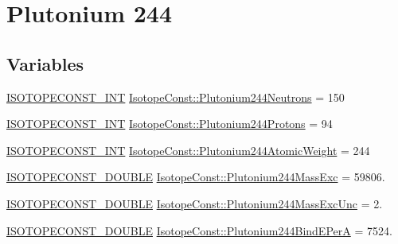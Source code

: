 \hypertarget{group___isotope_const-_plutonium-_pu244}{}\section{Plutonium 244}
\label{group___isotope_const-_plutonium-_pu244}
\subsection*{Variables}
\begin{DoxyCompactItemize}
\item 
\mbox{\hyperlink{group___isotope_const-_macros_ga5f18360b3e99483a35c32d789e62621c}{I\+S\+O\+T\+O\+P\+E\+C\+O\+N\+S\+T\+\_\+\+I\+NT}} \mbox{\hyperlink{group___isotope_const-_plutonium-_pu244_gae983817ecb52061ff706d189ea3bfec6}{Isotope\+Const\+::\+Plutonium244\+Neutrons}} = 150
\item 
\mbox{\hyperlink{group___isotope_const-_macros_ga5f18360b3e99483a35c32d789e62621c}{I\+S\+O\+T\+O\+P\+E\+C\+O\+N\+S\+T\+\_\+\+I\+NT}} \mbox{\hyperlink{group___isotope_const-_plutonium-_pu244_ga9787c2aa640a2328cdd90795dabf9a7a}{Isotope\+Const\+::\+Plutonium244\+Protons}} = 94
\item 
\mbox{\hyperlink{group___isotope_const-_macros_ga5f18360b3e99483a35c32d789e62621c}{I\+S\+O\+T\+O\+P\+E\+C\+O\+N\+S\+T\+\_\+\+I\+NT}} \mbox{\hyperlink{group___isotope_const-_plutonium-_pu244_ga065f95bb13a9b5dbdb73e11e9feccbb0}{Isotope\+Const\+::\+Plutonium244\+Atomic\+Weight}} = 244
\item 
\mbox{\hyperlink{group___isotope_const-_macros_ga8f45a7272ce02c0b4c65c44636ed719a}{I\+S\+O\+T\+O\+P\+E\+C\+O\+N\+S\+T\+\_\+\+D\+O\+U\+B\+LE}} \mbox{\hyperlink{group___isotope_const-_plutonium-_pu244_gaa27373f8cb68a77a6dccf4d6b11c63ef}{Isotope\+Const\+::\+Plutonium244\+Mass\+Exc}} = 59806.
\item 
\mbox{\hyperlink{group___isotope_const-_macros_ga8f45a7272ce02c0b4c65c44636ed719a}{I\+S\+O\+T\+O\+P\+E\+C\+O\+N\+S\+T\+\_\+\+D\+O\+U\+B\+LE}} \mbox{\hyperlink{group___isotope_const-_plutonium-_pu244_gaf1051c4b55d24651a0d85c3003b601ad}{Isotope\+Const\+::\+Plutonium244\+Mass\+Exc\+Unc}} = 2.
\item 
\mbox{\hyperlink{group___isotope_const-_macros_ga8f45a7272ce02c0b4c65c44636ed719a}{I\+S\+O\+T\+O\+P\+E\+C\+O\+N\+S\+T\+\_\+\+D\+O\+U\+B\+LE}} \mbox{\hyperlink{group___isotope_const-_plutonium-_pu244_ga1490d8c895128144a92756ccc16c49f9}{Isotope\+Const\+::\+Plutonium244\+Bind\+E\+PerA}} = 7524.
\item 

\end{DoxyCompactItemize}
